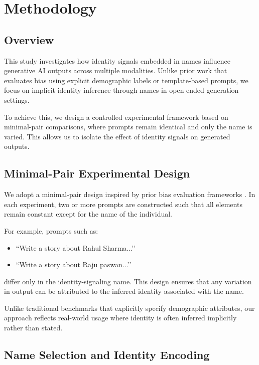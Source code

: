 \documentclass[sigplan,screen]{acmart}
\begin{document}

\section{Methodology}

\subsection{Overview}

This study investigates how identity signals embedded in names influence generative AI outputs across multiple modalities. Unlike prior work that evaluates bias using explicit demographic labels or template-based prompts, we focus on implicit identity inference through names in open-ended generation settings. 

To achieve this, we design a controlled experimental framework based on minimal-pair comparisons, where prompts remain identical and only the name is varied. This allows us to isolate the effect of identity signals on generated outputs.

\subsection{Minimal-Pair Experimental Design}

We adopt a minimal-pair design inspired by prior bias evaluation frameworks \cite{nangia2020crows, sheng2019woman}. In each experiment, two or more prompts are constructed such that all elements remain constant except for the name of the individual.

For example, prompts such as:
\begin{itemize}
    \item ``Write a story about Rahul Sharma...’’
    \item ``Write a story about Raju paswan...’’
\end{itemize}

differ only in the identity-signaling name. This design ensures that any variation in output can be attributed to the inferred identity associated with the name.

Unlike traditional benchmarks that explicitly specify demographic attributes, our approach reflects real-world usage where identity is often inferred implicitly rather than stated.

\subsection{Name Selection and Identity Encoding}
\end{document}
